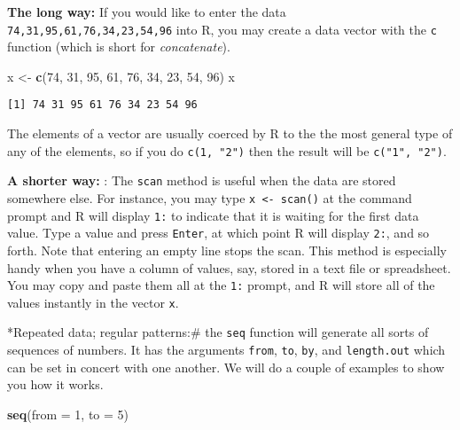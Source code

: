 \documentclass[]{book}
\newenvironment{Shaded}{\begin{snugshade}}{\end{snugshade}}
\newcommand{\KeywordTok}[1]{\textcolor[rgb]{0.13,0.29,0.53}{\textbf{{#1}}}}
\newcommand{\DataTypeTok}[1]{\textcolor[rgb]{0.13,0.29,0.53}{{#1}}}
\newcommand{\DecValTok}[1]{\textcolor[rgb]{0.00,0.00,0.81}{{#1}}}
\newcommand{\StringTok}[1]{\textcolor[rgb]{0.31,0.60,0.02}{{#1}}}
\newcommand{\NormalTok}[1]{{#1}}
\numberwithin{equation}{chapter}
\numberwithin{figure}{chapter}
\theoremstyle{plain}
\theoremstyle{definition}
\theoremstyle{remark}
\theoremstyle{definition}
\theoremstyle{definition}
\theoremstyle{remark}
\begin{document}
\textbf{The long way:}  If you would like to enter
the data \texttt{74,31,95,61,76,34,23,54,96} into R, you may create a
data vector with the \texttt{c} function (which is short for
\emph{concatenate}).

\begin{Shaded}
\begin{Highlighting}[]
\NormalTok{x <-}\StringTok{ }\KeywordTok{c}\NormalTok{(}\DecValTok{74}\NormalTok{, }\DecValTok{31}\NormalTok{, }\DecValTok{95}\NormalTok{, }\DecValTok{61}\NormalTok{, }\DecValTok{76}\NormalTok{, }\DecValTok{34}\NormalTok{, }\DecValTok{23}\NormalTok{, }\DecValTok{54}\NormalTok{, }\DecValTok{96}\NormalTok{)}
\NormalTok{x}
\end{Highlighting}
\end{Shaded}

\begin{verbatim}
[1] 74 31 95 61 76 34 23 54 96
\end{verbatim}

The elements of a vector are usually coerced by R to the the most
general type of any of the elements, so if you do \texttt{c(1,\ "2")}
then the result will be \texttt{c("1",\ "2")}.

\textbf{A shorter way:} : The \texttt{scan}
method is useful when the data are stored somewhere else. For instance,
you may type \texttt{x\ \textless{}-\ scan()} at the command prompt and
R will display \texttt{1:} to indicate that it is waiting for the first
data value. Type a value and press \texttt{Enter}, at which point R will
display \texttt{2:}, and so forth. Note that entering an empty line
stops the scan. This method is especially handy when you have a column
of values, say, stored in a text file or spreadsheet. You may copy and
paste them all at the \texttt{1:} prompt, and R will store all of the
values instantly in the vector \texttt{x}.

*Repeated data; regular patterns:\# the \texttt{seq}
 function will generate all sorts of sequences
of numbers. It has the arguments \texttt{from}, \texttt{to},
\texttt{by}, and \texttt{length.out} which can be set in concert with
one another. We will do a couple of examples to show you how it works.

\begin{Shaded}
\begin{Highlighting}[]
\KeywordTok{seq}\NormalTok{(}\DataTypeTok{from =} \DecValTok{1}\NormalTok{, }\DataTypeTok{to =} \DecValTok{5}\NormalTok{)}
\end{Highlighting}
\end{Shaded}
\end{document}
